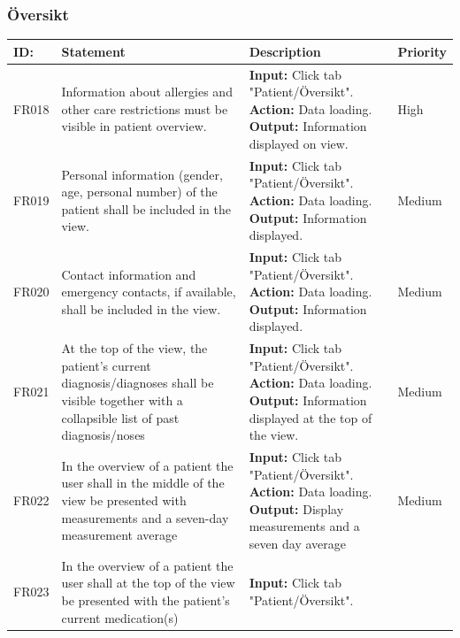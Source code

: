 \documentclass{scrreprt}
\begin{document}
\subsubsection{Översikt}
\begin{center}
\begin{tabularx}{\linewidth}{| l | X | X | l |}
\hline
\textbf{ID:} & \textbf{Statement} & \textbf{Description} & \textbf{Priority} \\ 
\hline
FR018 & Information about allergies and other care restrictions must be visible in patient overview. & \textbf{Input:} Click tab "Patient/Översikt".
\newline \textbf{Action:} Data loading.
\newline \textbf{Output:} Information displayed on view. & High \\ 
\hline
FR019 & Personal information (gender, age, personal number) of the patient shall be included in the view. & \textbf{Input:} Click tab "Patient/Översikt".
\newline \textbf{Action:} Data loading.
\newline \textbf{Output:} Information displayed. & Medium \\ 
\hline
FR020 & Contact information and emergency contacts, if available, shall be included in the view. & \textbf{Input:} Click tab "Patient/Översikt".
\newline \textbf{Action:} Data loading.
\newline \textbf{Output:} Information displayed. & Medium \\ 
\hline
FR021 & At the top of the view, the patient's current diagnosis/diagnoses shall be visible together with a collapsible list of past diagnosis/noses & \textbf{Input:} Click tab "Patient/Översikt".
\newline \textbf{Action:} Data loading.
\newline \textbf{Output:} Information displayed at the top of the view. & Medium \\ 
\hline
FR022 & In the overview of a patient the user shall in the middle of the view be presented with measurements and a seven-day measurement average & \textbf{Input:} Click tab "Patient/Översikt".
\newline \textbf{Action:} Data loading.
\newline \textbf{Output:} Display measurements and a seven day average & Medium \\ 
\hline
FR023 & In the overview of a patient the user shall at the top of the view be presented with the patient’s current medication(s) & \textbf{Input:} Click tab "Patient/Översikt".

\end{tabularx}
\end{center}
\end{document}
